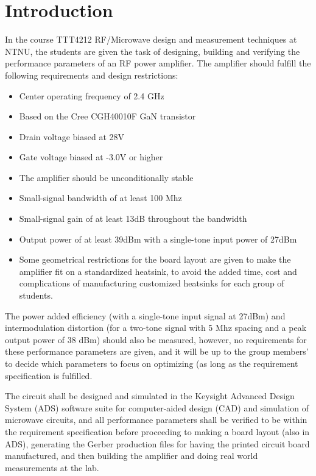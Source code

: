 \chapter{Introduction}
In the course TTT4212 RF/Microwave design and measurement techniques at NTNU, the students are given the task of designing, building and verifying the performance parameters of an RF power amplifier. The amplifier should fulfill the following requirements and design restrictions:

\begin{itemize}
	\item Center operating frequency of 2.4 GHz
	\item Based on the Cree CGH40010F GaN transistor
	\item Drain voltage biased at 28V
	\item Gate voltage biased at -3.0V or higher
	\item The amplifier should be unconditionally stable
	\item Small-signal bandwidth of at least 100 Mhz
	\item Small-signal gain of at least 13dB throughout the bandwidth
	\item Output power of at least 39dBm with a single-tone input power of 27dBm
	\item Some geometrical restrictions for the board layout are given to make the amplifier fit on a standardized heatsink, to avoid the added time, cost and complications of manufacturing customized heatsinks for each group of students.
\end{itemize}
The power added efficiency (with a single-tone input signal at 27dBm) and intermodulation distortion (for a two-tone signal with 5 Mhz spacing and a peak output power of 38 dBm) should also be measured, however, no requirements for these performance parameters are given, and it will be up to the group members’ to decide which parameters to focus on optimizing (as long as the requirement specification is fulfilled.

The circuit shall be designed and simulated in the Keysight Advanced Design System (ADS) software suite for computer-aided design (CAD) and simulation of microwave circuits, and all performance parameters shall be verified to be within the requirement specification before proceeding to making a board layout (also in ADS), generating the Gerber production files for having the printed circuit board manufactured, and then building the amplifier and doing real world measurements at the lab.